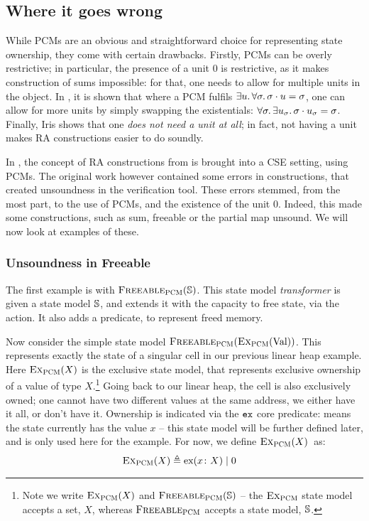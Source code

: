 \subsection{Where it goes wrong}

While PCMs are an obvious and straightforward choice for representing state ownership, they come with certain drawbacks. Firstly, PCMs can be overly restrictive; in particular, the presence of a unit $0$ is restrictive, as it makes construction of sums impossible: for that, one needs to allow for multiple units in the object. In \cite{sepalgebra}, it is shown that where a PCM fulfils $\exists u\ldotp \forall \sigma\ldotp \sigma\cdot u = \sigma$, one can allow for more units by simply swapping the existentials: $\forall \sigma\ldotp \exists u_\sigma\ldotp \sigma \cdot u_\sigma = \sigma$. Finally, Iris \cite{iris} shows that one \emph{does not need a unit at all}; in fact, not having a unit makes RA constructions easier to do soundly.

In \cite{sacha-phd}, the concept of RA constructions from \cite{iris} is brought into a CSE setting, using PCMs. The original work however contained some errors in constructions, that created unsoundness in the verification tool. These errors stemmed, from the most part, to the use of PCMs, and the existence of the unit $0$. Indeed, this made some constructions, such as sum, freeable or the partial map unsound. We will now look at examples of these.

\subsubsection{Unsoundness in Freeable}

The first example is with $\textsc{Freeable}_{\textsc{PCM}}(\mathbb S)$. This state model \emph{transformer} is given a state model $\mathbb S$, and extends it with the capacity to free state, via the \free{} action. It also adds a \freedP{} predicate, to represent freed memory.

Now consider the simple state model $\textsc{Freeable}_{\textsc{PCM}}(\textsc{Ex}_{\textsc{PCM}}(\text{Val}))$. This represents exactly the state of a singular cell in our previous linear heap example. Here $\textsc{Ex}_{\textsc{PCM}}(X)$ is the exclusive state model, that represents exclusive ownership of a value of type $X$.\footnote{Note we write $\textsc{Ex}_{\textsc{PCM}}(X)$ and $\textsc{Freeable}_{\textsc{PCM}}(\mathbb S)$ -- the $\textsc{Ex}_{\textsc{PCM}}$ state model accepts a set, $X$, whereas $\textsc{Freeable}_{\textsc{PCM}}$ accepts a state model, $\mathbb S$.} Going back to our linear heap, the cell is also exclusively owned; one cannot have two different values at the same address, we either have it all, or don't have it. Ownership is indicated via the $\texttt{ex}$ core predicate:  means the state currently has the value $x$ -- this state model will be further defined later, and is only used here for the example. For now, we define $\textsc{Ex}_{\textsc{PCM}}(X)$~as:
\begin{align*}
	\textsc{Ex}_{\textsc{PCM}}(X) &\triangleq \text{ex}(x\colon X) \mid 0
\end{align*}

